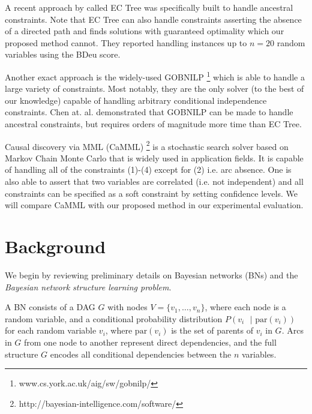 \documentclass[twoside,11pt]{article}
\begin{document}
\medskip
A recent approach by \cite{Chen2016} called EC Tree was specifically built to handle ancestral constraints. Note
that EC Tree can also handle constraints asserting the absence of a directed path and finds solutions with guaranteed optimality
which our proposed method cannot. They reported handling instances up to $n = 20$ random variables using the BDeu score.

\medskip
Another exact approach is the widely-used GOBNILP \footnote{www.cs.york.ac.uk/aig/sw/gobnilp/} which is able to handle a large variety of
constraints. Most notably, they are the only solver (to the best of our knowledge) capable of handling arbitrary conditional independence
constraints. Chen at. al. demonstrated that GOBNILP can be made to handle ancestral constraints, but requires orders of magnitude
more time than EC Tree.

\medskip
Causal discovery via MML (CaMML) \footnote{http://bayesian-intelligence.com/software/} is a stochastic search solver based on Markov Chain Monte Carlo
that is widely used in application fields. It is capable of handling all of the constraints (1)-(4) except for (2) i.e. arc absence. One is also able to
assert that two variables are correlated (i.e. not independent) and all constraints can be specified as a soft constraint by setting confidence levels. We will 
compare CaMML with our proposed method in our experimental evaluation. 


%
%
\section{Background}
\label{SECTION:Background}

We begin by reviewing preliminary details on Bayesian networks (BNs) and the \emph{Bayesian network structure learning problem}. 

\medskip

A BN consists of a DAG $G$ with nodes $V = \{v_1, \ldots , v_n\}$, where each node is a random variable, and a conditional probability distribution
$P(v_i \text{ }| \text{ par}(v_i))$ for each random variable $v_i$, where $\text{par}(v_i)$ is the set of parents of $v_i$ in $G$. Arcs in $G$ from one node to another
represent direct dependencies, and the full structure $G$ encodes all conditional dependencies between the $n$ variables. 

\medskip
\end{document}
